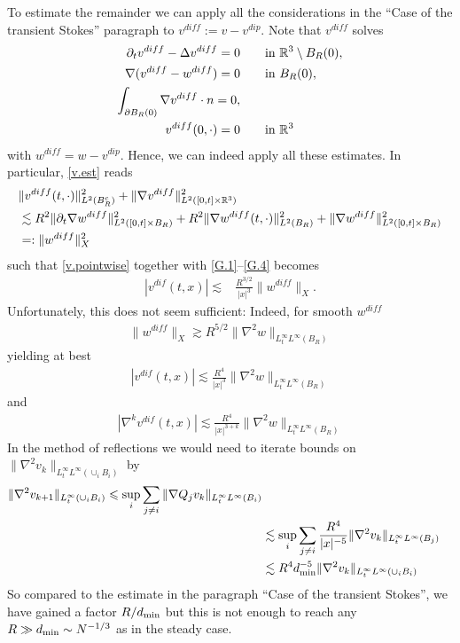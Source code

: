 \documentclass[abstracton, paper=a4, fontsize=11pt,DIV=12,bibliography=totoc]{scrartcl}
\begin{document}
To estimate the remainder we can apply all the considerations in the \enquote{Case of the transient Stokes} paragraph to $ v^{diff} := v- v^{dip}$. Note that $ v^{diff}$ solves
\begin{align}
  \partial_t v^{diff}  -  \Delta v^{diff}  = 0 &\qquad  \text{in }  \mathbb{R}^3 \setminus B_R(0), \\
    \nabla (v^{diff} -  w^{diff}) = 0   & \qquad  \text{in }   B_R(0), \\
    \int_{\partial B_R(0)}  \nabla v^{diff} \cdot n = 0, \\
            v^{diff}(0,\cdot) = 0 & \qquad  \text{in }  \mathbb{R}^3
\end{align}
with $w^{diff} = w - v^{dip}$. Hence, we can indeed apply all these estimates. In particular, \eqref{v.est} reads 
\begin{align} \label{v.est}
        &\|v^{diff}(t,\cdot)\|_{L^2(B_R^c)}^2  + \|\nabla  v^{diff}\|_{L^2([0,t] \times \mathbb{R}^3)}^2 \\
        &\lesssim R^2 \|\partial_t \nabla  w^{diff}\|_{L^2([0,t]\times B_R)}^2 + R^2 \|\nabla w^{diff}(t,\cdot)\|_{L^2(B_R)}^2  + \|\nabla  w^{diff}\|_{L^2([0,t] \times  B_R)}^2 \\
        &=: \|w^{diff}\|_X^2
\end{align}
such that \eqref{v.pointwise} together with \eqref{G.1}--\eqref{G.4} becomes 
\begin{align*}
        |v^{dif}(t,x)|  \lesssim & \frac{R^{3/2}}{|x|^{3}} \|w^{diff}\|_X.
\end{align*}
Unfortunately, this does not seem sufficient: Indeed, for smooth $w^{diff}$
\begin{align*}
    \|w^{diff}\|_X \gtrsim R^{5/2} \|\nabla^2 w\|_{L^\infty_t L^\infty(B_R)}
\end{align*}
yielding at best
\begin{align*}
     |v^{dif}(t,x)| \lesssim \frac{R^{4}}{|x|^{3}}  \|\nabla^2 w\|_{L^\infty_t L^\infty(B_R)}
\end{align*}
and 
\begin{align*}
     |\nabla^k v^{dif}(t,x)| \lesssim \frac{R^{4}}{|x|^{3+k}}  \|\nabla^2 w\|_{L^\infty_t L^\infty(B_R)}
\end{align*}
In the method of reflections we would need to iterate bounds on $\|\nabla^2 v_k\|_{L^\infty_t L^\infty(\cup_i B_i)}$
by 
\begin{align*}
    \|\nabla^2 v_{k+1}\|_{L^\infty_t (\cup_i B_i)} \leqslant \sup_i \sum_{j \neq i} \|\nabla Q_j v_k\|_{L^\infty_t L^\infty(B_i)} \\
    & \lesssim \sup_i \sum_{j \neq i} \frac{R^{4}}{|x|^{-5}}  \|\nabla^2 v_k\|_{L^\infty_t L^\infty(B_j)} \\
    & \lesssim R^4 d_{\mathrm{min}}^{-5}  \|\nabla^2 v_k\|_{L^\infty_t L^\infty(\cup_i B_i)}
\end{align*}
So compared to the estimate in the paragraph \enquote{Case of the transient Stokes}, we have gained a factor $R/{d_{\mathrm{min}}}$ but this is not enough to reach any $R \gg d_{\mathrm{min}} \sim N^{-1/3}$ as in the steady case.
\end{document}

